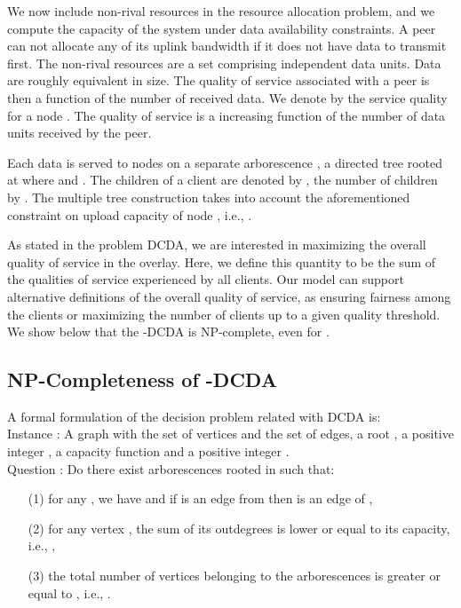 We now include non-rival resources in the resource allocation problem,
and we compute the capacity of the system under data availability
constraints. A peer can not allocate any of its uplink bandwidth if it
does not have data to transmit first. The non-rival resources are a
set  comprising independent data units. Data are roughly equivalent
in size. The quality of service associated with a peer is then a
function of the number of received data. We denote by  the
service quality for a node . The quality of service is a increasing
function of the number of data units received by the peer.

Each data  is served to nodes on a separate arborescence
, a directed tree rooted at  where 
and . The children of a client  are
denoted by , the number of children by . The multiple
tree construction takes into account the aforementioned constraint on
upload capacity of node , i.e., .

As stated in the problem DCDA, we are interested in maximizing the
overall quality of service in the overlay. Here, we define this
quantity to be the sum of the qualities of service  experienced
by all clients. Our model can support alternative definitions of the
overall quality of service, as ensuring fairness among the clients or
maximizing the number of clients up to a given quality threshold. We
show below that the -DCDA is NP-complete, even for .

\subsection{NP-Completeness of -DCDA}

A formal formulation of the decision problem related with DCDA is: \\
{\sc Instance :} A graph  with  the set of vertices and  the set of edges, a root , a positive integer , a capacity function  and a positive integer .\\
{\sc Question :} Do there exist  arborescences  rooted in  such that:
\begin{itemize}
\item[(1)] for any , we have  and if  is an edge from  then  is an edge of ,
\item[(2)] for any vertex , the sum of its outdegrees is
  lower or equal to its capacity, i.e., ,
\item[(3)] the total number of vertices belonging to the
  arborescences is greater or equal to , i.e., .
\end{itemize}






